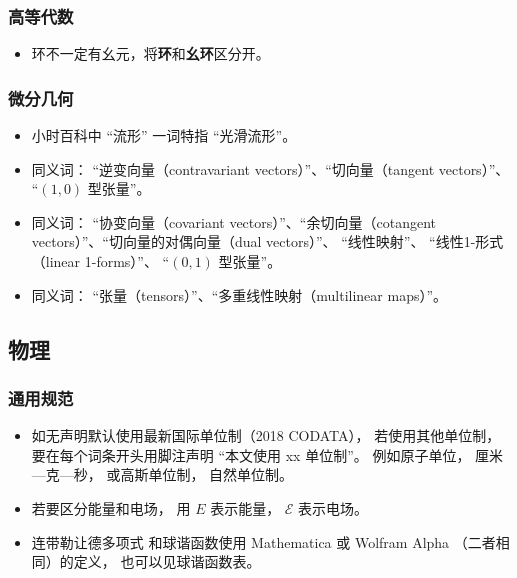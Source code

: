 \subsubsection{高等代数}
\begin{itemize}
\item 环不一定有幺元，将\textbf{环}和\textbf{幺环}区分开。
\end{itemize}


\subsubsection{微分几何}
\begin{itemize}
\item 小时百科中 “流形” 一词特指 “光滑流形”。
\item 同义词： “逆变向量（contravariant vectors）”、“切向量（tangent vectors）”、 “$(1, 0)$ 型张量”。
\item 同义词： “协变向量（covariant vectors）”、“余切向量（cotangent vectors）”、“切向量的对偶向量（dual vectors）”、 “线性映射”、 “线性1-形式（linear 1-forms）”、 “$(0, 1)$ 型张量”。
\item 同义词： “张量（tensors）”、“多重线性映射（multilinear maps）”。
\end{itemize}

\subsection{物理}
\subsubsection{通用规范}
\begin{itemize}
\item 如无声明默认使用最新国际单位制（2018 CODATA）， 若使用其他单位制， 要在每个词条开头用脚注声明 “本文使用 xx 单位制”。 例如原子单位， 厘米—克—秒， 或高斯单位制， 自然单位制。
\item 若要区分能量和电场， 用 $E$ 表示能量， $\mathcal E$ 表示电场。
\item 连带勒让德多项式 和球谐函数使用 Mathematica 或 Wolfram Alpha （二者相同）的定义， 也可以见球谐函数表。
\end{itemize}

